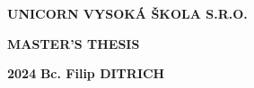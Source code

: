 \pagestyle{empty}
\begin{center}
{\Large\bfseries\MakeUppercase{Unicorn Vysoká škola s.r.o.}}
    \vfill

    {\Huge\bfseries\MakeUppercase{Master's Thesis}} \\

    \vfill

    \noindent\begin{minipage}{\textwidth}
                 \begin{Large}
                     \textbf{2024} \hfill \textbf{Bc. Filip \MakeUppercase{Ditrich}}
                 \end{Large}
    \end{minipage}
\end{center}
